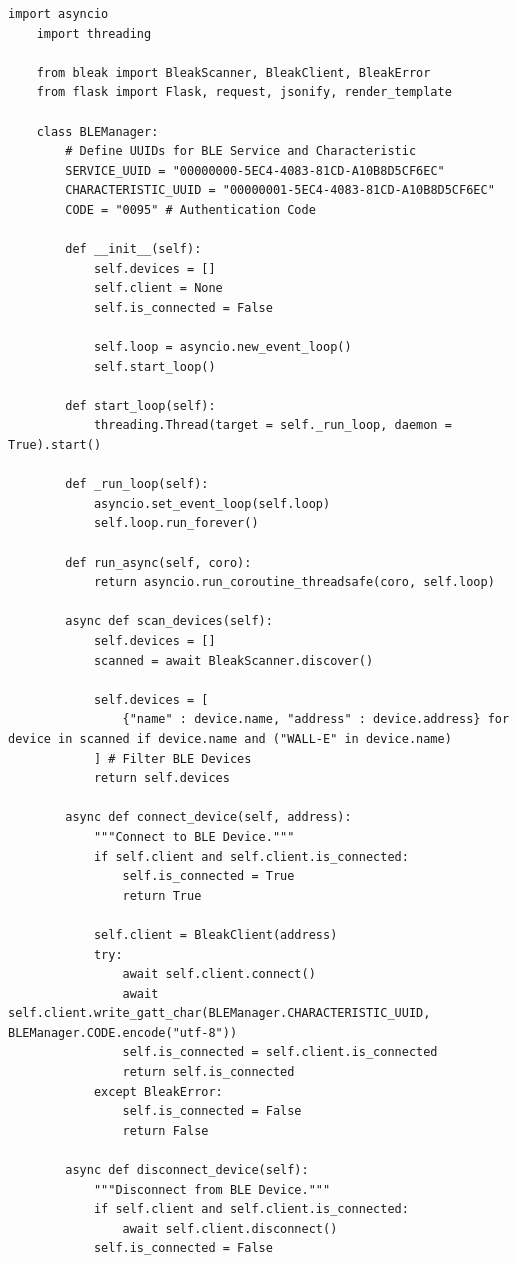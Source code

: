 \documentclass{article}
\begin{document}
\begin{lstlisting}[caption={Source Code : Robot Driver App}, label={lst:driver_app_code}]
    import asyncio
    import threading

    from bleak import BleakScanner, BleakClient, BleakError
    from flask import Flask, request, jsonify, render_template

    class BLEManager:
        # Define UUIDs for BLE Service and Characteristic
        SERVICE_UUID = "00000000-5EC4-4083-81CD-A10B8D5CF6EC"
        CHARACTERISTIC_UUID = "00000001-5EC4-4083-81CD-A10B8D5CF6EC"
        CODE = "0095" # Authentication Code

        def __init__(self):
            self.devices = []
            self.client = None
            self.is_connected = False

            self.loop = asyncio.new_event_loop()
            self.start_loop()

        def start_loop(self):
            threading.Thread(target = self._run_loop, daemon = True).start()

        def _run_loop(self):
            asyncio.set_event_loop(self.loop)
            self.loop.run_forever()

        def run_async(self, coro):
            return asyncio.run_coroutine_threadsafe(coro, self.loop)

        async def scan_devices(self):
            self.devices = []
            scanned = await BleakScanner.discover()

            self.devices = [
                {"name" : device.name, "address" : device.address} for device in scanned if device.name and ("WALL-E" in device.name)
            ] # Filter BLE Devices
            return self.devices

        async def connect_device(self, address):
            """Connect to BLE Device."""
            if self.client and self.client.is_connected:
                self.is_connected = True
                return True

            self.client = BleakClient(address)
            try:
                await self.client.connect()
                await self.client.write_gatt_char(BLEManager.CHARACTERISTIC_UUID, BLEManager.CODE.encode("utf-8"))
                self.is_connected = self.client.is_connected
                return self.is_connected
            except BleakError:
                self.is_connected = False
                return False

        async def disconnect_device(self):
            """Disconnect from BLE Device."""
            if self.client and self.client.is_connected:
                await self.client.disconnect()
            self.is_connected = False


\end{lstlisting}
\end{document}

